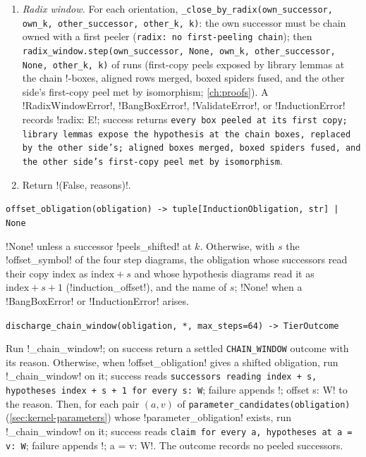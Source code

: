 \begin{algorithm}
\begin{enumerate}
\item \emph{Radix window.} For each orientation, \texttt{\_\allowbreak{}close\_\allowbreak{}by\_\allowbreak{}radix(\allowbreak{}own\_\allowbreak{}successor,\allowbreak{} own\_\allowbreak{}k,\allowbreak{} other\_\allowbreak{}successor,\allowbreak{} other\_\allowbreak{}k,\allowbreak{} k)}: the own successor must be chain owned with a first peeler (\texttt{radix: no first-peeling chain}); then \texttt{radix\_\allowbreak{}window.\allowbreak{}step(\allowbreak{}own\_\allowbreak{}successor,\allowbreak{} None,\allowbreak{} own\_\allowbreak{}k,\allowbreak{} other\_\allowbreak{}successor,\allowbreak{} None,\allowbreak{} other\_\allowbreak{}k,\allowbreak{} k)} of  runs (first-copy peels exposed by library lemmas at the chain !-boxes, aligned rows merged, boxed spiders fused, and the other side's first-copy peel met by isomorphism; \cref{ch:proofs}). A \py!RadixWindowError!, \py!BangBoxError!, \py!ValidateError!, or \py!InductionError! records \code!radix: E!; success returns \texttt{every box peeled at its first copy; library lemmas expose the hypothesis at the chain boxes,\allowbreak{} replaced by the other side's; aligned boxes merged,\allowbreak{} boxed spiders fused,\allowbreak{} and the other side's first-copy peel met by isomorphism}.
\item Return \py!(False, reasons)!.
\end{enumerate}
\end{algorithm}

\begin{signature}
\texttt{offset\_\allowbreak{}obligation(\allowbreak{}obligation) -> tuple[InductionObligation,\allowbreak{} str] | None}

\py!None! unless a successor \py!peels_shifted! at $k$. Otherwise, with $s$ the \py!offset_symbol! of the four step diagrams, the obligation whose successors read their copy index as $\text{index}+s$ and whose hypothesis diagrams read it as $\text{index}+s+1$ (\py!induction_offset!), and the name of $s$; \py!None! when a \py!BangBoxError! or \py!InductionError! arises.

\texttt{discharge\_\allowbreak{}chain\_\allowbreak{}window(\allowbreak{}obligation,\allowbreak{} *,\allowbreak{} max\_\allowbreak{}steps=64) -> TierOutcome}

Run \py!_chain_window!; on success return a settled \texttt{CHAIN\_WINDOW} outcome with its reason. Otherwise, when \py!offset_obligation! gives a shifted obligation, run \py!_chain_window! on it; success reads \texttt{successors reading index + s,\allowbreak{} hypotheses index + s + 1 for every s: W}; failure appends \code!; offset s: W! to the reason. Then, for each pair $(a, v)$ of \texttt{parameter\_\allowbreak{}candidates(\allowbreak{}obligation)} (\cref{sec:kernel-parameters}) whose \py!parameter_obligation! exists, run \py!_chain_window! on it; success reads \texttt{claim for every a,\allowbreak{} hypotheses at a = v: W}; failure appends \code!; a = v: W!. The outcome records no peeled successors.
\end{signature}

